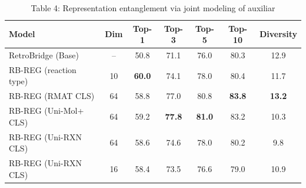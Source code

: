 \begin{table}[t]
\centering
\caption{Table 4: Representation entanglement via joint modeling of auxiliar}
\label{tab:2605.24428}
\begin{tabular}{lcccccc}
\toprule
Model & Dim & Top-1 & Top-3 & Top-5 & Top-10 & Diversity \\
\midrule
RetroBridge (Base) & – & 50.8 & 71.1 & 76.0 & 80.3 & 12.9 \\
RB-REG (reaction type) & 10 & \textbf{60.0} & 74.1 & 78.0 & 80.4 & 11.7 \\
RB-REG (RMAT CLS) & 64 & 58.8 & 77.0 & 80.8 & \textbf{83.8} & \textbf{13.2} \\
RB-REG (Uni-Mol+ CLS) & 64 & 59.2 & \textbf{77.8} & \textbf{81.0} & 83.2 & 10.3 \\
RB-REG (Uni-RXN CLS) & 64 & 58.6 & 74.6 & 78.0 & 80.2 & 9.8 \\
RB-REG (Uni-RXN CLS) & 16 & 58.4 & 73.5 & 76.6 & 79.0 & 10.9 \\
\bottomrule
\end{tabular}
\end{table}
